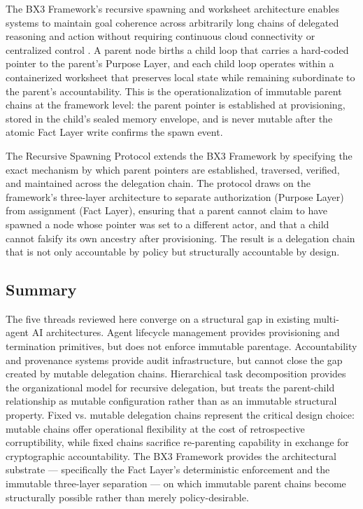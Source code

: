 The BX3 Framework's recursive spawning and worksheet architecture enables systems to maintain goal coherence across arbitrarily long chains of delegated reasoning and action without requiring continuous cloud connectivity or centralized control \cite{bx3whitepaper2026}. A parent node births a child loop that carries a hard-coded pointer to the parent's Purpose Layer, and each child loop operates within a containerized worksheet that preserves local state while remaining subordinate to the parent's accountability. This is the operationalization of immutable parent chains at the framework level: the parent pointer is established at provisioning, stored in the child's sealed memory envelope, and is never mutable after the atomic Fact Layer write confirms the spawn event.

The Recursive Spawning Protocol extends the BX3 Framework by specifying the exact mechanism by which parent pointers are established, traversed, verified, and maintained across the delegation chain. The protocol draws on the framework's three-layer architecture to separate authorization (Purpose Layer) from assignment (Fact Layer), ensuring that a parent cannot claim to have spawned a node whose pointer was set to a different actor, and that a child cannot falsify its own ancestry after provisioning. The result is a delegation chain that is not only accountable by policy but structurally accountable by design.

\subsection{Summary}
\label{sec:background-summary}

The five threads reviewed here converge on a structural gap in existing multi-agent AI architectures. Agent lifecycle management provides provisioning and termination primitives, but does not enforce immutable parentage. Accountability and provenance systems provide audit infrastructure, but cannot close the gap created by mutable delegation chains. Hierarchical task decomposition provides the organizational model for recursive delegation, but treats the parent-child relationship as mutable configuration rather than as an immutable structural property. Fixed vs. mutable delegation chains represent the critical design choice: mutable chains offer operational flexibility at the cost of retrospective corruptibility, while fixed chains sacrifice re-parenting capability in exchange for cryptographic accountability. The BX3 Framework provides the architectural substrate --- specifically the Fact Layer's deterministic enforcement and the immutable three-layer separation --- on which immutable parent chains become structurally possible rather than merely policy-desirable.


